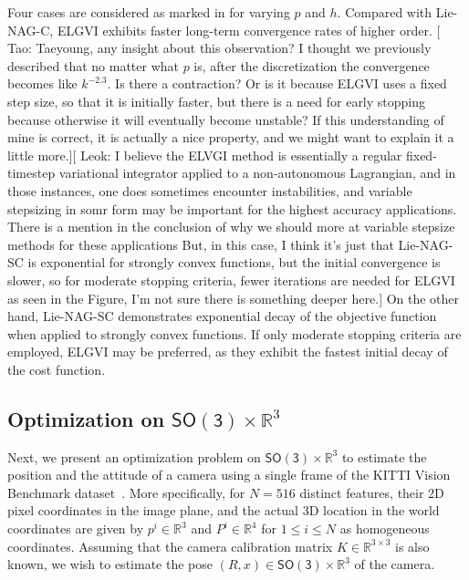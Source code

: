 \documentclass[letterpaper, 10pt, conference]{ieeeconf}
\newcommand{\SO}{\ensuremath{\mathsf{SO(3)}}}
\renewcommand{\Re}{\ensuremath{\mathbb{R}}}
\newcommand{\tao}[1]{[{\color{blue} Tao: #1}]}
\newcommand{\leok}[1]{[{\color{orange} Leok: #1}]}
\begin{document}
Four cases are considered as marked in  for varying $p$ and $h$.
Compared with Lie-NAG-C, ELGVI exhibits faster long-term convergence rates of higher order. \tao{Taeyoung, any insight about this observation? I thought we previously described that no matter what $p$ is, after the discretization the convergence becomes like $k^{-2.3}$. Is there a contraction? Or is it because ELGVI uses a fixed step size, so that it is initially faster, but there is a need for early stopping because otherwise it will eventually become unstable? If this understanding of mine is correct, it is actually a nice property, and we might want to explain it a little more.}\leok{I believe the ELVGI method is essentially a regular fixed-timestep variational integrator applied to a non-autonomous Lagrangian, and in those instances, one does sometimes encounter instabilities, and variable stepsizing in somr form may be important for the highest accuracy applications. There is a mention in the conclusion of why we should more at variable stepsize methods for these applications  But, in this case, I think it's just that Lie-NAG-SC is exponential for strongly convex functions, but the initial convergence is slower, so for moderate stopping criteria, fewer iterations are needed for ELGVI as seen in the Figure, I'm not sure there is something deeper here.}
On the other hand, Lie-NAG-SC demonstrates exponential decay of the objective function when applied to strongly convex functions. If only moderate stopping criteria are employed, ELGVI may be preferred, as they exhibit the fastest initial decay of the cost function.

\subsection{Optimization on $\SO\times \Re^3$}

Next, we present an optimization problem on $\SO\times\Re^3$ to estimate the position and the attitude of a camera using a single frame of the KITTI Vision Benchmark dataset~\cite{Geiger2013IJRR}.
More specifically, for $N=516$ distinct features, their 2D pixel coordinates in the image plane, and the actual 3D location in the world coordinates are given by $p^i\in\Re^3$ and $P^i\in\Re^4$ for $1\leq i\leq N$ as homogeneous coordinates. 
Assuming that the camera calibration matrix $K\in\Re^{3\times 3}$ is also known, we wish to estimate the pose $(R,x)\in\SO\times \Re^3$ of the camera.  
\end{document}
